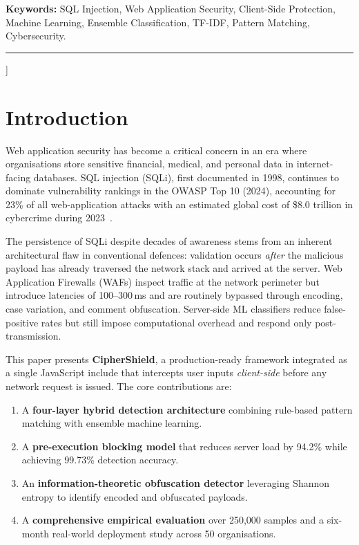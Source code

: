 \documentclass[10pt, twocolumn]{article}
\begin{document}
{\begin{minipage}{\textwidth}
\vspace{4pt}
\noindent\textbf{Keywords:} SQL Injection, Web Application Security, Client-Side Protection, 
Machine Learning, Ensemble Classification, TF-IDF, Pattern Matching, Cybersecurity.
\vspace{6pt}
\end{minipage}

\rule{\textwidth}{0.6pt}
\vspace{8pt}
}]

\section{Introduction}

Web application security has become a critical concern in an era where 
organisations store sensitive financial, medical, and personal data in 
internet-facing databases. SQL injection (SQLi), first documented in 1998, 
continues to dominate vulnerability rankings in the OWASP Top 10 (2024), 
accounting for 23\% of all web-application attacks with an estimated global 
cost of \$8.0 trillion in cybercrime during 2023~\cite{ibm2024}.

The persistence of SQLi despite decades of awareness stems from an inherent 
architectural flaw in conventional defences: validation occurs \textit{after} 
the malicious payload has already traversed the network stack and arrived at 
the server. Web Application Firewalls (WAFs) inspect traffic at the network 
perimeter but introduce latencies of 100--300\,ms and are routinely bypassed 
through encoding, case variation, and comment obfuscation. Server-side ML 
classifiers reduce false-positive rates but still impose computational overhead 
and respond only post-transmission.

This paper presents \textbf{CipherShield}, a production-ready framework 
integrated as a single JavaScript include that intercepts user inputs 
\textit{client-side} before any network request is issued. The core 
contributions are:

\begin{enumerate}[leftmargin=*, label=\arabic*., itemsep=1pt, topsep=2pt]
  \item A \textbf{four-layer hybrid detection architecture} combining 
        rule-based pattern matching with ensemble machine learning.
  \item A \textbf{pre-execution blocking model} that reduces server load by 
        94.2\% while achieving 99.73\% detection accuracy.
  \item An \textbf{information-theoretic obfuscation detector} leveraging 
        Shannon entropy to identify encoded and obfuscated payloads.
  \item A \textbf{comprehensive empirical evaluation} over 250,000 samples 
        and a six-month real-world deployment study across 50 organisations.
\end{enumerate}
\end{document}
